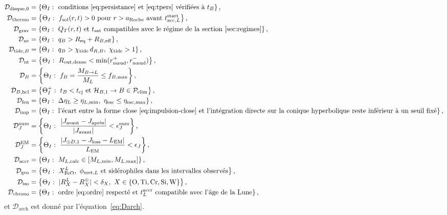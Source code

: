 \documentclass[11pt,a4paper,openany]{report}
\newcommand{\Req}{R_{\mathrm{eq}}}
\newcommand{\aR}{a_{\mathrm{Roche}}}
\begin{document}
\begin{align}
\mathcal{D}_{\mathrm{disque},0}&=\left\{\Theta_I:\ \text{conditions~\eqref{eq:persistance} et~\eqref{eq:tpers} vérifiées à }t_B\right\},
\label{eq:Ddisque}\\
\mathcal{D}_{\mathrm{thermo}}&=\left\{\Theta_I:\ f_{\mathrm{sol}}(r,t)>0\ \text{pour }r>\aR\ \text{avant }
t^{\mathrm{start}}_{\mathrm{acc},L}\right\},
\label{eq:Dthermo}\\
\mathcal{D}_{\mathrm{grav}}&=\left\{\Theta_I:\ Q_T(r,t)\ \text{et}\ t_{\mathrm{sat}}\ \text{compatibles avec le régime de la section~\ref{sec:regimes}}\right\},
\label{eq:Dgrav}\\
\mathcal{D}_{\mathrm{nc}}&=\left\{\Theta_I:\ q_B>\Req+R_{B,\mathrm{eff}}\right\},
\label{eq:Dnc}\\
\mathcal{D}_{\mathrm{tide},B}&=\left\{\Theta_I:\ q_B>\chi_{\mathrm{tide}}\,d_{R,B},\ \chi_{\mathrm{tide}}>1\right\},
\label{eq:DtideB}\\
\mathcal{D}_{\mathrm{nt}}&=\left\{\Theta_I:\ R_{\mathrm{out,dense}}<\min(r^{+}_{\text{nœud}},r^{-}_{\text{nœud}})\right\},
\label{eq:Dnt}\\
\mathcal{D}_{B}&=\left\{\Theta_I:\ f_B=\frac{M_{B\to L}}{M_L}\le f_{B,\max}\right\},
\label{eq:DB}\\
\mathcal{D}_{B,\mathrm{hel}}&=\left\{\Theta_I^{+}:\ t_B<t_{\mathrm{ej}}
\text{ et }\mathcal{H}_{B,1}\to B\in\mathcal{P}_{\mathrm{elim}}\right\},
\label{eq:DBhel}\\
\mathcal{D}_{\mathrm{fen}}&=\left\{\Theta_I:\ \Delta\eta_L\ge\eta_{L,\min},\ \eta_{\mathrm{esc}}\le\eta_{\mathrm{esc},\max}\right\},
\label{eq:Dfen}\\
\mathcal{D}_{\mathrm{imp}}&=\left\{\Theta_I:\ \text{l'écart entre la forme close~\eqref{eq:impulsion-close}
et l'intégration directe sur la conique hyperbolique reste inférieur à un seuil fixé}\right\},
\label{eq:Dimp}\\
\mathcal{D}_{J}^{\mathrm{num}}&=\left\{\Theta_I:\ \frac{|J_{\mathrm{avant}}-J_{\text{après}}|}{|J_{\mathrm{avant}}|}<\epsilon_J^{\mathrm{num}}\right\},
\label{eq:DJ}\\
\mathcal{D}_{J}^{\mathrm{EM}}&=\left\{\Theta_I:\ \frac{|J_{\oplus D,1}-J_{\mathrm{loss}}-L_{\mathrm{EM}}|}{L_{\mathrm{EM}}}<\epsilon_J\right\},
\label{eq:DJEM}\\
\mathcal{D}_{\mathrm{accr}}&=\left\{\Theta_I:\ M_{L,\mathrm{calc}}\in[M_{L,\min},M_{L,\max}]\right\},
\label{eq:Daccr}\\
\mathcal{D}_{\mathrm{geo}}&=\left\{\Theta_I:\ X^L_{\mathrm{FeO}},\ \phi_{\mathrm{met},L}\ \text{et sidérophiles dans les intervalles observés}\right\},
\label{eq:Dgeo}\\
\mathcal{D}_{\mathrm{iso}}&=\left\{\Theta_I:\ |R_X^L-R_X^\oplus|<\delta_X,\ X\in\{\mathrm{O},\mathrm{Ti},\mathrm{Cr},\mathrm{Si},\mathrm{W}\}\right\},
\label{eq:Diso}\\
\mathcal{D}_{\mathrm{chrono}}&=\left\{\Theta_I:\ \text{ordre~\eqref{eq:ordre} respecté et }
t^{\mathrm{accr}}_L\ \text{compatible avec l'âge de la Lune}\right\},
\label{eq:Dchrono}
\end{align}
et $\mathcal{D}_{\mathrm{arch}}$ est donné par l'équation~\eqref{eq:Darch}.
\end{document}
